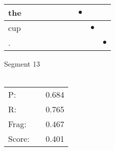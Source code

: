 \documentclass[landscape]{article}
\newcommand{\ssp}{\hspace{2pt}}
\newcommand{\mex}{\cellcolor{g}$\bullet$}
\begin{document}
\begin{tabular}{|l|p{10pt}|p{10pt}|p{10pt}|p{10pt}|p{10pt}|p{10pt}|p{10pt}|p{10pt}|p{10pt}|}
\hline
\ssp \cellcolor{ref6}the \ssp&\hspace{2pt}&\hspace{2pt}&\hspace{2pt}&\hspace{2pt}&\hspace{2pt}&\hspace{2pt}&\hspace{2pt}\mex&\hspace{2pt}&\hspace{2pt}\\
\hline
\ssp \cellcolor{ref7}cup \ssp&\hspace{2pt}&\hspace{2pt}&\hspace{2pt}&\hspace{2pt}&\hspace{2pt}&\hspace{2pt}&\hspace{2pt}&\hspace{2pt}\mex&\hspace{2pt}\\
\hline
\ssp \cellcolor{ref8}. \ssp&\hspace{2pt}&\hspace{2pt}&\hspace{2pt}&\hspace{2pt}&\hspace{2pt}&\hspace{2pt}&\hspace{2pt}&\hspace{2pt}&\hspace{2pt}\mex\\
\hline
\end{tabular}

\vspace{6pt}
\noindent Segment 13\\\\
\noindent\begin{tabular}{lm{12pt}r}
\hline
P:&&0.684\\
R:&&0.765\\
Frag:&&0.467\\
Score:&&0.401\\
\end{tabular}

\newpage
\end{document}
